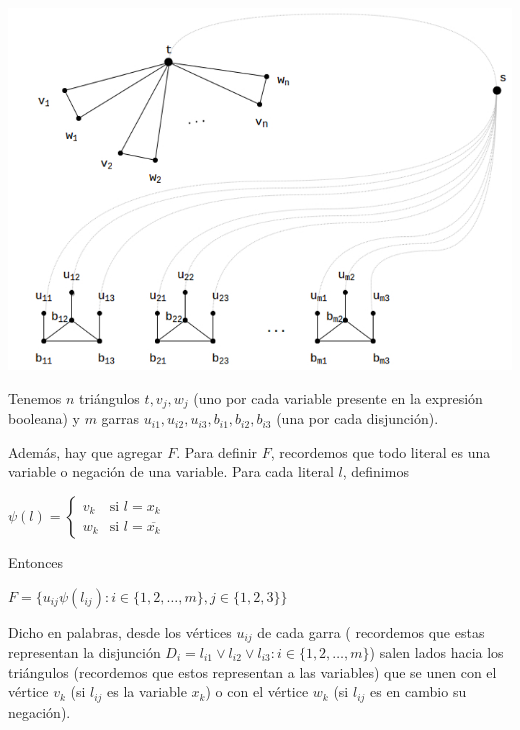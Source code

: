 \documentclass[10pt,a4paper]{article}
\begin{document}
\begin{center}

    \begin{adjustbox}{max size={\textwidth}{\textheight}}
        \includegraphics{definitions/3_color_np_complete.jpg}
        \end{adjustbox}
    
\end{center}

Tenemos $n$ triángulos $t, v_j, w_j$ (uno por cada variable presente en la expresión booleana) y $m$ garras $u_{i1}, u_{i2}, u_{i3}, b_{i1}, b_{i2}, b_{i3}$ (una por cada disjunción).

Además, hay que agregar $F$. Para definir $F$, recordemos que todo literal es una variable o negación de una variable. Para cada literal $l$, definimos

\begin{center}
$\psi(l) = \begin{cases} v_k &\text{si } l = x_k\\ w_k & \text{si } l = \overline{x_k} \end{cases}$
\end{center}

Entonces

\begin{center}
$F = \{u_{ij}\psi(l_{ij}):i \in \{1, 2, \dots, m\}, j \in \{1,2,3\}\}$
\end{center}

Dicho en palabras, desde los vértices $u_{ij}$ de cada garra ( recordemos que estas representan la disjunción $D_i = l_{i1} \lor l_{i2} \lor l_{i3} : i \in \{1,2,\dots, m\}$) salen lados hacia los triángulos (recordemos que estos representan a las variables) que se unen con el vértice $v_k$ (si $l_{ij}$ es la variable $x_k$) o con el vértice $w_k$ (si $l_{ij}$ es en cambio su negación).
\end{document}
